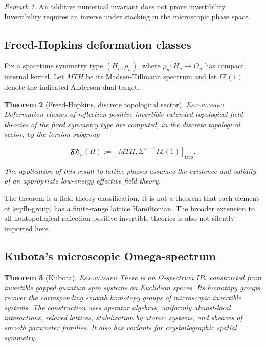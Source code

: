 \documentclass[12pt]{article}
\newtheorem{theorem}{Theorem}[section]
\theoremstyle{definition}
\theoremstyle{remark}
\newtheorem{remark}[theorem]{Remark}
\newcommand{\FH}{\mathfrak{FH}}
\newcommand{\IP}{\mathit{IP}}
\newcommand{\EST}{\textnormal{\textsc{Established}}}
\begin{document}
\begin{remark}
An additive numerical invariant does not prove invertibility.  Invertibility
requires an inverse under stacking in the microscopic phase space.
\end{remark}

\subsection{Freed-Hopkins deformation classes}

Fix a spacetime symmetry type $(H_n,\rho_n)$, where
$\rho_n:H_n\to O_n$ has compact internal kernel.  Let $MTH$ be its
Madsen-Tillmann spectrum and let $I\mathbb Z(1)$ denote the indicated
Anderson-dual target.

\begin{theorem}[Freed-Hopkins, discrete topological sector]
\label{thm:fh}
\EST{}  Deformation classes of reflection-positive invertible extended
topological field theories of the fixed symmetry type are computed, in the
discrete topological sector, by the torsion subgroup

\begin{equation}
  \FH_n(H)
  :=[MTH,\Sigma^{n+1}I\mathbb Z(1)]_{\mathrm{tors}}.
  \label{eq:fh-group}
\end{equation}

The application of this result to lattice phases assumes the existence and
validity of an appropriate low-energy effective field theory.
\end{theorem}

The theorem is a field-theory classification.  It is not a theorem that each
element of \cref{eq:fh-group} has a finite-range lattice Hamiltonian.  The
broader extension to all nontopological reflection-positive invertible
theories is also not silently imported here.

\subsection{Kubota's microscopic Omega-spectrum}

\begin{theorem}[Kubota]
\label{thm:kubota}
\EST{}  There is an $\Omega$-spectrum $\IP_*$ constructed from invertible
gapped quantum spin systems on Euclidean spaces.  Its homotopy groups recover
the corresponding smooth homotopy groups of microscopic invertible systems.
The construction uses operator algebras, uniformly almost-local
interactions, relaxed lattices, stabilization by atomic systems, and sheaves
of smooth parameter families.  It also has variants for crystallographic
spatial symmetry.
\end{theorem}
\end{document}
